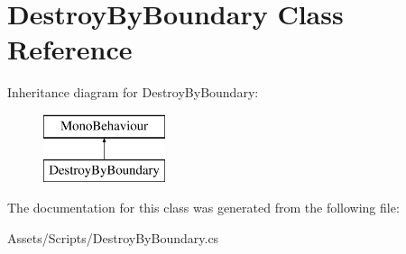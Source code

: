 \hypertarget{class_destroy_by_boundary}{}\section{Destroy\+By\+Boundary Class Reference}
\label{class_destroy_by_boundary}
Inheritance diagram for Destroy\+By\+Boundary\+:\begin{figure}[H]
\begin{center}
\leavevmode
\includegraphics[height=2.000000cm]{class_destroy_by_boundary}
\end{center}
\end{figure}


The documentation for this class was generated from the following file\+:\begin{DoxyCompactItemize}
\item 
Assets/\+Scripts/Destroy\+By\+Boundary.\+cs\end{DoxyCompactItemize}
